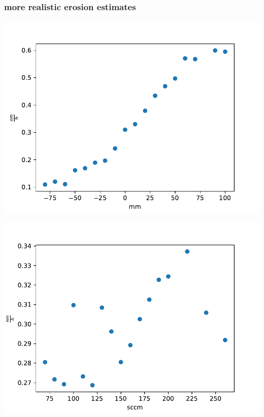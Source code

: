 \documentclass{beamer} %
\begin{document}
\begin{frame}
    \frametitle{more realistic erosion estimates}
    \begin{minipage}{0.49\textwidth}
        \includegraphics[width=1.1\textwidth]{figures/PosVary_H2_2A_sput.pdf}
    \end{minipage}
    \begin{minipage}{0.49\textwidth}
        \includegraphics[width=1.1\textwidth]{figures/Gasvary_H2_2A_sput.pdf}
    \end{minipage}
    \begin{minipage}{0.49\textwidth}

\end{minipage}
\end{frame}
\end{document}
